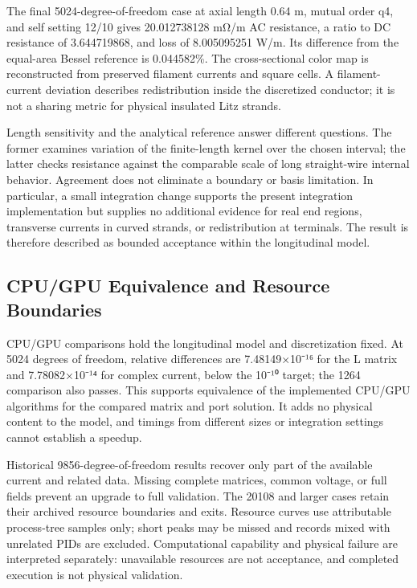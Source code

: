 \documentclass[11pt]{article}
\begin{document}
The final 5024-degree-of-freedom case at axial length 0.64 m, mutual order q4, and self setting 12/10 gives 20.012738128 mΩ/m AC resistance, a ratio to DC resistance of 3.644719868, and loss of 8.005095251 W/m. Its difference from the equal-area Bessel reference is 0.044582\%. The cross-sectional color map is reconstructed from preserved filament currents and square cells. A filament-current deviation describes redistribution inside the discretized conductor; it is not a sharing metric for physical insulated Litz strands.


Length sensitivity and the analytical reference answer different questions. The former examines variation of the finite-length kernel over the chosen interval; the latter checks resistance against the comparable scale of long straight-wire internal behavior. Agreement does not eliminate a boundary or basis limitation. In particular, a small integration change supports the present integration implementation but supplies no additional evidence for real end regions, transverse currents in curved strands, or redistribution at terminals. The result is therefore described as bounded acceptance within the longitudinal model.


\subsection*{CPU/GPU Equivalence and Resource Boundaries}
\hypertarget{03.compute.heading}{}
CPU/GPU comparisons hold the longitudinal model and discretization fixed. At 5024 degrees of freedom, relative differences are 7.48149×10⁻¹⁶ for the L matrix and 7.78082×10⁻¹⁴ for complex current, below the 10⁻¹⁰ target; the 1264 comparison also passes. This supports equivalence of the implemented CPU/GPU algorithms for the compared matrix and port solution. It adds no physical content to the model, and timings from different sizes or integration settings cannot establish a speedup.


Historical 9856-degree-of-freedom results recover only part of the available current and related data. Missing complete matrices, common voltage, or full fields prevent an upgrade to full validation. The 20108 and larger cases retain their archived resource boundaries and exits. Resource curves use attributable process-tree samples only; short peaks may be missed and records mixed with unrelated PIDs are excluded. Computational capability and physical failure are interpreted separately: unavailable resources are not acceptance, and completed execution is not physical validation.
\end{document}
